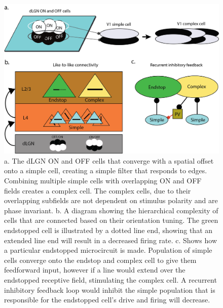 \documentclass[12pt]{article}
\begin{document}
\begin{figure}[H]
  \centering
  \includegraphics[width=1.0 \textwidth]{adjusted_figures/LIF_Overview_Receptive_Field_Methods.png}
  \caption{a. The dLGN ON and OFF cells that converge with a spatial offset onto a simple cell, creating a simple filter that responds to edges. Combining multiple simple cells with overlapping ON and OFF fields creates a complex cell. The complex cells, due to their overlapping subfields are not dependent on stimulus polarity and are phase invariant. b. A diagram showing the hierarchical complexity of cells that are connected based on their orientation tuning. The green endstopped cell is illustrated by a dotted line end, showing that an extended line end will result in a decreased firing rate. c. Shows how a particular endstopped microcircuit is made. Population of simple cells converge onto the endstop and complex cell to give them feedforward input, however if a line would extend over the endstopped receptive field, stimulating the complex cell. A recurrent inhibitory feedback loop would inhibit the simple population that is responsible for the endstopped cell's drive and firing will decrease. }
  \label{fig:LIF_Overview}
\end{figure}
\end{document}
